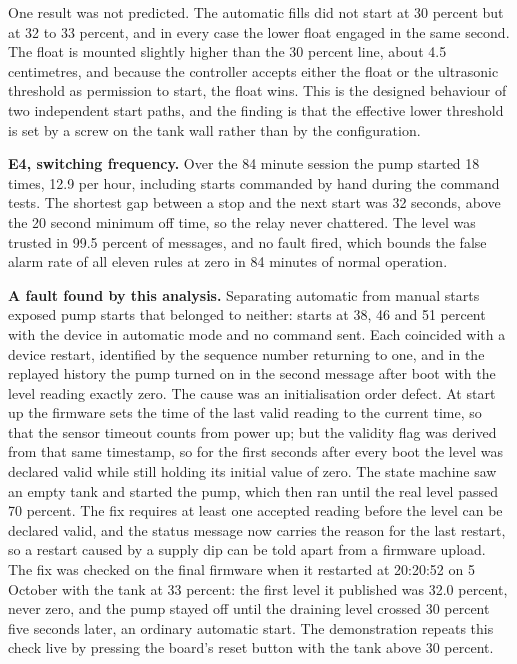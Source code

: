 One result was not predicted. The automatic fills did not start at 30 percent but at 32 to 33 percent, and in every case the lower float engaged in the same second. The float is mounted slightly higher than the 30 percent line, about 4.5 centimetres, and because the controller accepts either the float or the ultrasonic threshold as permission to start, the float wins. This is the designed behaviour of two independent start paths, and the finding is that the effective lower threshold is set by a screw on the tank wall rather than by the configuration.

\textbf{E4, switching frequency.} Over the 84 minute session the pump started 18 times, 12.9 per hour, including starts commanded by hand during the command tests. The shortest gap between a stop and the next start was 32 seconds, above the 20 second minimum off time, so the relay never chattered. The level was trusted in 99.5 percent of messages, and no fault fired, which bounds the false alarm rate of all eleven rules at zero in 84 minutes of normal operation.

\textbf{A fault found by this analysis.} Separating automatic from manual starts exposed pump starts that belonged to neither: starts at 38, 46 and 51 percent with the device in automatic mode and no command sent. Each coincided with a device restart, identified by the sequence number returning to one, and in the replayed history the pump turned on in the second message after boot with the level reading exactly zero. The cause was an initialisation order defect. At start up the firmware sets the time of the last valid reading to the current time, so that the sensor timeout counts from power up; but the validity flag was derived from that same timestamp, so for the first seconds after every boot the level was declared valid while still holding its initial value of zero. The state machine saw an empty tank and started the pump, which then ran until the real level passed 70 percent. The fix requires at least one accepted reading before the level can be declared valid, and the status message now carries the reason for the last restart, so a restart caused by a supply dip can be told apart from a firmware upload. The fix was checked on the final firmware when it restarted at 20:20:52 on 5 October with the tank at 33 percent: the first level it published was 32.0 percent, never zero, and the pump stayed off until the draining level crossed 30 percent five seconds later, an ordinary automatic start. The demonstration repeats this check live by pressing the board's reset button with the tank above 30 percent.

